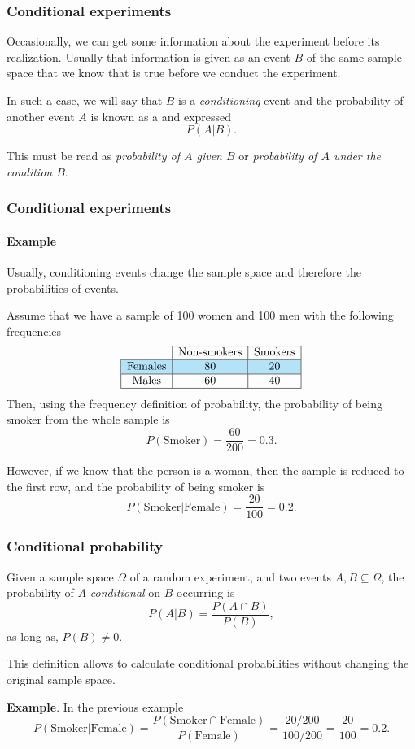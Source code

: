 \begin{frame}
\frametitle{Conditional experiments}
Occasionally, we can get some information about the experiment before its realization. 
Usually that information is given as an event $B$ of the same sample space that we know that is true before we conduct the experiment.

In such a case, we will say that $B$ is a \emph{conditioning} event and the probability of another event $A$ is known as a  and expressed 
\[
P(A|B).
\]

This must be read as \emph{probability of $A$ given $B$} or \emph{probability of $A$ under the condition $B$}.
\end{frame}

\begin{frame}
\frametitle{Conditional experiments}
\framesubtitle{Example}
Usually, conditioning events change the sample space and therefore the probabilities of events.
 
Assume that we have a sample of 100 women and 100 men with the following frequencies
\[
\begin{array}{|c|c|c|}
\cline{2-3}
 \multicolumn{1}{c|}{} & \mbox{Non-smokers} & \mbox{Smokers} \\ \hline
 \rowcolor{color1!30} \mbox{Females} & 80 & 20 \\ \hline
 \mbox{Males} & 60 & 40 \\ \hline
\end{array}
\]
Then, using the frequency definition of probability, the probability of being smoker from the whole sample is
\[
P(\mbox{Smoker})= \frac{60}{200}=0.3.
\]

\pause

However, if we know that the person is a woman, then the sample is reduced to the first row, and the probability of being smoker is 
\[
P(\mbox{Smoker}|\mbox{Female})=\frac{20}{100}=0.2.
\]
\end{frame}


\begin{frame}
\frametitle{Conditional probability}
\begin{definition}
Given a sample space $\Omega$ of a random experiment, and two events $A,B\subseteq \Omega$, the probability of $A$ \emph{conditional} on $B$ occurring is
\[
P(A|B) = \frac{P(A\cap B)}{P(B)},
\]
as long as, $P(B)\neq 0$.
\end{definition}

This definition allows to calculate conditional probabilities without changing the original sample space. 

\textbf{Example}. In the previous example
\[
P(\mbox{Smoker}|\mbox{Female})= \frac{P(\mbox{Smoker}\cap \mbox{Female})}{P(\mbox{Female})} = \frac{20/200}{100/200}=\frac{20}{100}=0.2.
\]
\end{frame}


